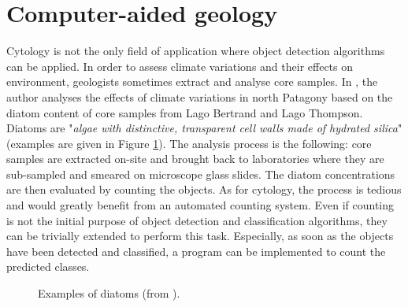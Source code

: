 \section{Computer-aided geology}
Cytology is not the only field of application where object detection algorithms can be applied. In order to assess climate variations and their effects on environment, geologists sometimes extract and analyse core samples. In  \cite{vsacre2011}, the author analyses the effects of climate variations in north Patagony based on the diatom content of core samples from Lago Bertrand and Lago Thompson. Diatoms are "\textit{algae with distinctive, transparent cell walls made of hydrated silica}" \cite{diatoms2016} (examples are given in Figure \ref{fig:diatoms}). The analysis process is the following: core samples are extracted on-site and brought back to laboratories where they are sub-sampled and smeared on microscope glass slides. The diatom concentrations are then evaluated by counting the objects. As for cytology, the process is tedious and would greatly benefit from an automated counting system. Even if counting is not the initial purpose of object detection and classification algorithms, they can be trivially extended to perform this task. Especially, as soon as the objects have been detected and classified, a program can be implemented to count the predicted classes.

\begin{figure}
	\center
	\caption{Examples of diatoms (from \cite{vsacre2011}).}
	\label{fig:diatoms}
\end{figure}